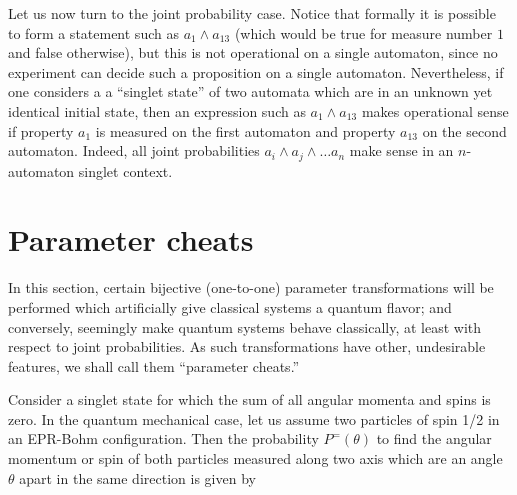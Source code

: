 Let us now turn to the joint probability case.
Notice that formally it is possible to form a statement such as $a_1\wedge a_{13}$
(which would be true for measure number $1$ and false otherwise),
but this is not operational on a single automaton,
since no experiment can decide such a proposition on a single automaton.
Nevertheless, if one considers a a ``singlet state'' of two automata which are in an unknown
yet identical initial state, then an expression such as $a_1\wedge a_{13}$ makes operational sense
if property $a_1$ is measured on the first automaton
and property $a_{13}$ on the second automaton. Indeed, all joint probabilities
$a_i\wedge a_j\wedge \ldots a_n$
make sense  in an $n$-automaton singlet context.


\section{Parameter cheats}

In this section, certain bijective (one-to-one) parameter  transformations will be performed which
artificially give classical systems a quantum flavor; and conversely,
seemingly make quantum systems behave classically,
at least with respect to joint probabilities.
As such transformations have other, undesirable features, we shall call them
``parameter cheats.''


Consider a singlet state
for which the sum of all angular momenta and spins is zero.
In the quantum mechanical case, let us assume two particles of spin 1/2
in an EPR-Bohm configuration.
Then the probability
$P^{=}(\theta )$
to find the angular momentum or spin of
both particles
measured along two axis which are an angle $\theta $ apart
in the same direction is given by \cite{svozil-krenn}

